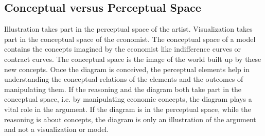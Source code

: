 \documentclass[a4paper, 12pt]{article}
\begin{document}
\subsection*{Conceptual versus Perceptual Space}
Illustration takes part in the perceptual space of the artist. Visualization takes part in the conceptual space of the economist. The conceptual space of a model contains the concepts imagined by the economist like indifference curves or contract curves. The conceptual space is the image of the world built up by these new concepts. Once the diagram is conceived, the perceptual elements help in understanding the conceptual relations of the elements and the outcomes of manipulating them. If the reasoning and the diagram both take part in the conceptual space, i.e. by manipulating economic concepts, the diagram plays a vital role in the argument. If the diagram is in the perceptual space, while the reasoning is about concepts, the diagram is only an illustration of the argument and not a visualization or model.
\end{document}
